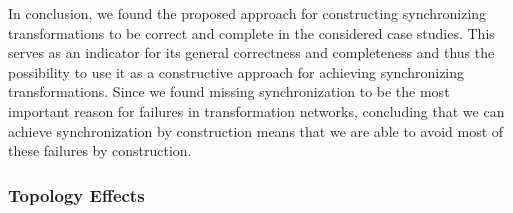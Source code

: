 In conclusion, we found the proposed approach for constructing synchronizing transformations to be correct and complete in the considered case studies.
This serves as an indicator for its general correctness and completeness and thus the possibility to use it as a constructive approach for achieving synchronizing transformations.
Since we found missing synchronization to be the most important reason for failures in transformation networks, concluding that we can achieve synchronization by construction means that we are able to avoid most of these failures by construction.


\subsubsection{Topology Effects}

